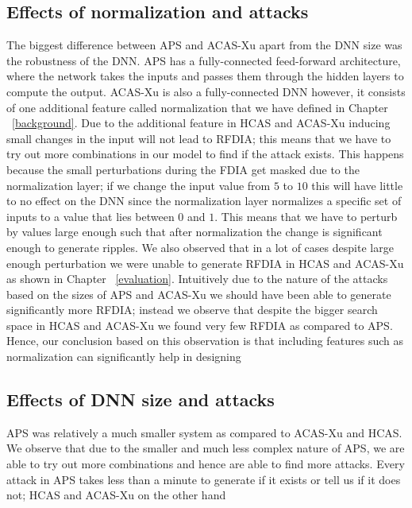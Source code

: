 \subsection{Effects of normalization and attacks}
The biggest difference between \ac{APS} and \ac{ACAS-Xu} apart from the \ac{DNN} size was the robustness of the \ac{DNN}. 
\ac{APS} has a fully-connected feed-forward architecture, where the network takes the inputs and passes them through the hidden layers to compute the output. 
\ac{ACAS-Xu} is also a fully-connected \ac{DNN} however, it consists of one additional feature called normalization that we have defined in Chapter ~\ref{background}.
Due to the additional feature in \ac{HCAS} and \ac{ACAS-Xu} inducing small changes in the input will not lead to \ac{RFDIA}; this means that we have to try out more combinations in our model to find if the attack exists. 
This happens because the small perturbations during the \ac{FDIA} get masked due to the normalization layer; if we change the input value from $5$ to $10$ this will have little to no effect on the \ac{DNN} since the normalization layer normalizes a specific set of inputs to a value that lies between $0$ and $1$. 
This means that we have to perturb by values large enough such that after normalization the change is significant enough to generate ripples. 
We also observed that in a lot of cases despite large enough perturbation we were unable to generate \ac{RFDIA} in \ac{HCAS} and \ac{ACAS-Xu} as shown in Chapter ~\ref{evaluation}.
Intuitively due to the nature of the attacks based on the sizes of \ac{APS} and \ac{ACAS-Xu} we should have been able to generate significantly more \ac{RFDIA}; instead we observe that despite the bigger search space in \ac{HCAS} and \ac{ACAS-Xu} we found very few \ac{RFDIA} as compared to \ac{APS}. 
Hence, our conclusion based on this observation is that including features such as normalization can significantly help in designing 
\subsection{Effects of DNN size and attacks}
\ac{APS} was relatively a much smaller system as compared to \ac{ACAS-Xu} and \ac{HCAS}.
We observe that due to the smaller and much less complex nature of \ac{APS}, we are able to try out more combinations and hence are able to find more attacks. 
Every attack in \ac{APS} takes less than a minute to generate if it exists or tell us if it does not; \ac{HCAS} and \ac{ACAS-Xu} on the other hand 







